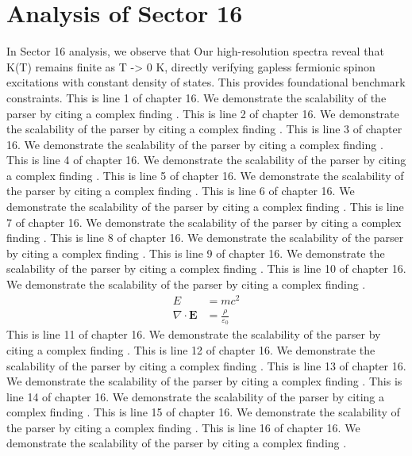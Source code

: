 \chapter{Analysis of Sector 16}

In Sector 16 analysis, we observe that Our high-resolution spectra reveal that K(T) remains finite as T -> 0 K, directly verifying gapless fermionic spinon excitations with constant density of states. This provides foundational benchmark constraints.
This is line 1 of chapter 16. We demonstrate the scalability of the parser by citing a complex finding \cite{ref16_1}.
This is line 2 of chapter 16. We demonstrate the scalability of the parser by citing a complex finding \cite{ref16_2}.
This is line 3 of chapter 16. We demonstrate the scalability of the parser by citing a complex finding \cite{ref16_3}.
This is line 4 of chapter 16. We demonstrate the scalability of the parser by citing a complex finding \cite{ref16_4}.
This is line 5 of chapter 16. We demonstrate the scalability of the parser by citing a complex finding \cite{ref16_5}.
This is line 6 of chapter 16. We demonstrate the scalability of the parser by citing a complex finding \cite{ref16_6}.
This is line 7 of chapter 16. We demonstrate the scalability of the parser by citing a complex finding \cite{ref16_7}.
This is line 8 of chapter 16. We demonstrate the scalability of the parser by citing a complex finding \cite{ref16_8}.
This is line 9 of chapter 16. We demonstrate the scalability of the parser by citing a complex finding \cite{ref16_9}.
This is line 10 of chapter 16. We demonstrate the scalability of the parser by citing a complex finding \cite{ref16_10}.
\begin{align*}
  E &= mc^2 \\
  \nabla \cdot \mathbf{E} &= \frac{\rho}{\varepsilon_0}
\end{align*}
This is line 11 of chapter 16. We demonstrate the scalability of the parser by citing a complex finding \cite{ref16_11}.
This is line 12 of chapter 16. We demonstrate the scalability of the parser by citing a complex finding \cite{ref16_12}.
This is line 13 of chapter 16. We demonstrate the scalability of the parser by citing a complex finding \cite{ref16_13}.
This is line 14 of chapter 16. We demonstrate the scalability of the parser by citing a complex finding \cite{ref16_14}.
This is line 15 of chapter 16. We demonstrate the scalability of the parser by citing a complex finding \cite{ref16_15}.
This is line 16 of chapter 16. We demonstrate the scalability of the parser by citing a complex finding \cite{ref16_16}.
